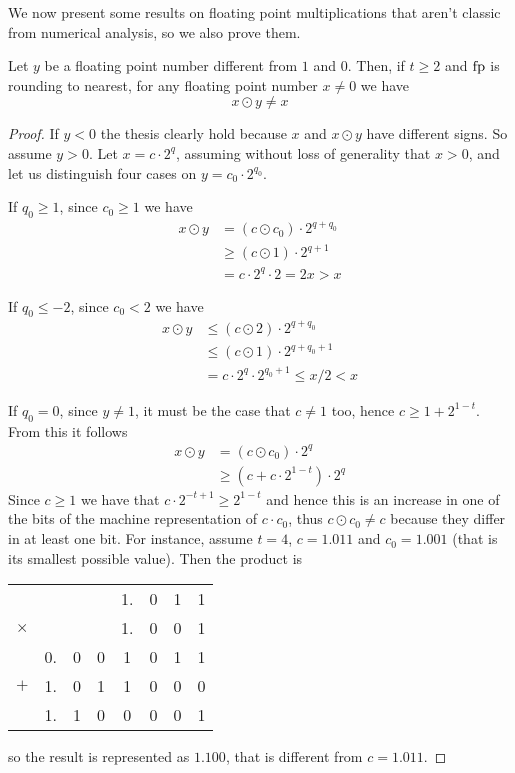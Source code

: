 We now present some results on floating point multiplications that aren't classic from numerical analysis, so we also prove them.
\begin{prop}\label{appA:th:mult-no-fixpoints}
	Let $y$ be a floating point number different from $1$ and $0$. Then, if $t \ge 2$ and $\text{fp}$ is rounding to nearest, for any floating point number $x \neq 0$ we have
	\[
	x \odot y \neq x
	\]
\end{prop}
\begin{proof}
	If $y < 0$ the thesis clearly hold because $x$ and $x \odot y$ have different signs. So assume $y > 0$.
	Let $x = c \cdot 2^q$, assuming without loss of generality that $x > 0$, and let us distinguish four cases on $y = c_0 \cdot 2^{q_0}$.

	If $q_0 \ge 1$, since $c_0 \ge 1$ we have
	\begin{align*}
		x \odot y &= (c \odot c_0) \cdot 2^{q + q_0} \\
		&\ge (c \odot 1) \cdot 2^{q + 1} \\
		&= c \cdot 2^{q} \cdot 2 = 2 x > x
	\end{align*}

	If $q_0 \le -2$, since $c_0 < 2$ we have
	\begin{align*}
		x \odot y &\le (c \odot 2) \cdot 2^{q + q_0} \\
		&\le (c \odot 1) \cdot 2^{q + q_0 + 1} \\
		&= c \cdot 2^{q} \cdot 2^{q_0 + 1} \le x / 2 < x
	\end{align*}

	If $q_0 = 0$, since $y \neq 1$, it must be the case that $c \neq 1$ too, hence $c \ge 1 + 2^{1-t}$. From this it follows
	\begin{align*}
		x \odot y &= (c \odot c_0) \cdot 2^q \\
		&\ge (c + c \cdot 2^{1-t}) \cdot 2^q
	\end{align*}
	Since $c \ge 1$ we have that $c \cdot 2^{-t+1} \ge 2^{1-t}$ and hence this is an increase in one of the bits of the machine representation of $c \cdot c_0$, thus $c \odot c_0 \neq c$ because they differ in at least one bit.
	For instance, assume $t = 4$, $c = 1.011$ and $c_0 = 1.001$ (that is its smallest possible value). Then the product is
	\begin{center}
		\begin{tabular}{c@{\;}c@{\,}c@{\,}c@{\,}c@{\,}c@{\,}c@{\,}c}
			& & & & 1. & 0 & 1 & 1 \\
			$\times$ & & & & 1. & 0 & 0 & 1 \\
			\hline
			& 0. & 0 & 0 & 1 & 0 & 1 & 1 \\
			$+$ & 1. & 0 & 1 & 1 & 0 & 0 & 0 \\
			\hline
			& 1. & 1 & 0 & 0 & 0 & 0 & 1
		\end{tabular}
	\end{center}
	so the result is represented as $1.100$, that is different from $c = 1.011$.


\end{proof}

